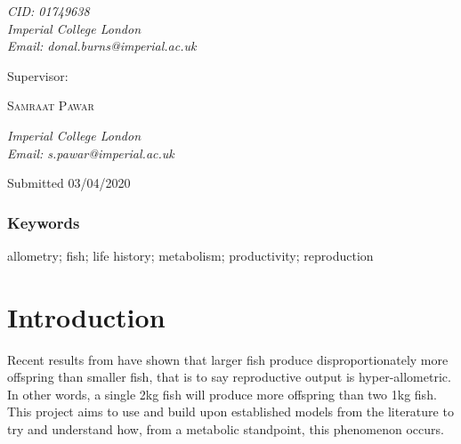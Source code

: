 \begin{titlepage}
	\textit{CID: 01749638 \\ Imperial College London \\ Email: donal.burns@imperial.ac.uk} %
	
	\vspace*{2\baselineskip} %
	

	
	Supervisor:
	
	
	\vspace{0.5\baselineskip} %
	
	{\scshape\Large Samraat Pawar \\} %
	
	\vspace{0.5\baselineskip} %
	
	\textit{Imperial College London \\ Email: s.pawar@imperial.ac.uk} %
	
	\vspace{3cm} %
	
	
	\crest %
	
	\vspace{0.3\baselineskip} %
	
	Submitted 03/04/2020 %
	

\end{titlepage}


\linenumbers

\subsubsection*{Keywords}
allometry; fish; life history; metabolism; productivity;  reproduction

\section*{Introduction}
Recent results from \cite{Barneche2018} have shown that larger fish produce disproportionately more offspring than smaller fish, that is to say reproductive output is hyper-allometric.  In other words, a single 2kg fish will produce more offspring than two 1kg fish.  This project aims to use and build upon established models from the literature to try and understand how, from a metabolic standpoint, this phenomenon occurs.
